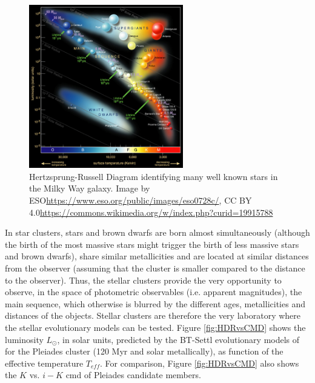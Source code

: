\begin{figure}[htp!]
\begin{center}
\includegraphics[page=1,width=0.6\textwidth]{background/Figures/Hertzsprung-Russel_StarData.png}
\caption{
Hertzsprung-Russell Diagram identifying many well known stars in the Milky Way galaxy. Image by ESO\url{https://www.eso.org/public/images/eso0728c/}, CC BY 4.0\url{https://commons.wikimedia.org/w/index.php?curid=19915788}
}
\label{fig:HR}
\end{center}
\end{figure}

In star clusters, stars and brown dwarfs are born almost simultaneously (although the birth of the most massive stars might trigger the birth of less massive stars and brown dwarfs), share similar metallicities and are located at similar distances from the observer (assuming that the cluster is smaller compared to the distance to the observer). Thus, the stellar clusters provide the very opportunity to observe, in the space of photometric observables (i.e. apparent magnitudes), the main sequence, which otherwise is blurred by the different ages, metallicities and distances of the objects. Stellar clusters are therefore the very laboratory where the stellar evolutionary models can be tested. Figure \ref{fig:HDRvsCMD} shows the luminosity $L_{\odot}$, in solar units, predicted by the BT-Settl evolutionary models of \citep{2014IAUS..299..271A} for the Pleiades cluster (120 Myr and solar metallically), as function of the effective temperature $T_{eff}$. For comparison, Figure \ref{fig:HDRvsCMD} also shows the $K$ vs. $i-K$ \gls{cmd} of \citet{Bouy2015} Pleiades candidate members. 

